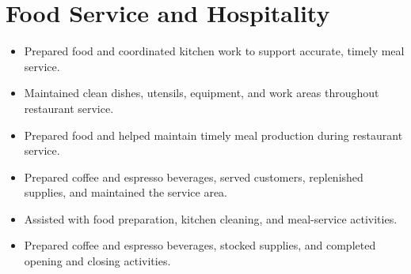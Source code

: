 \section{Food Service and Hospitality}
\label{sec:food_service_and_hospitality}

\begin{itemize}
  \item Prepared food and coordinated kitchen work to support accurate, timely meal service.
\end{itemize}

\begin{itemize}
  \item Maintained clean dishes, utensils, equipment, and work areas throughout restaurant service.
\end{itemize}

\begin{itemize}
  \item Prepared food and helped maintain timely meal production during restaurant service.
\end{itemize}

\begin{itemize}
  \item Prepared coffee and espresso beverages, served customers, replenished supplies, and maintained the service area.
\end{itemize}

\begin{itemize}
  \item Assisted with food preparation, kitchen cleaning, and meal-service activities.
\end{itemize}

\begin{itemize}
  \item Prepared coffee and espresso beverages, stocked supplies, and completed opening and closing activities.
\end{itemize}
